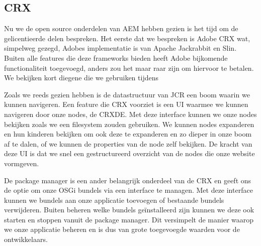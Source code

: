 \documentclass{article}
\begin{document}
	\subsection{CRX}
	Nu we de open source onderdelen van AEM hebben gezien is het tijd om de gelicentieerde delen bespreken. Het eerste dat we bespreken is Adobe CRX wat, simpelweg gezegd, Adobes implementatie is van Apache Jackrabbit en Slin. Buiten alle features die deze frameworks bieden heeft Adobe bijkomende functionaliteit toegevoegd, anders zou het maar raar zijn om hiervoor te betalen. We bekijken kort diegene die we gebruiken tijdens 
	\par
	Zoals we reeds gezien hebben is de datastructuur van JCR een boom waarin we kunnen navigeren. Een feature die CRX voorziet is een UI waarmee we kunnen navigeren door onze nodes, de CRXDE. Met deze interface kunnen we onze nodes bekijken zoals we een filesystem zouden gebruiken. We kunnen nodes expanderen en hun kinderen bekijken om ook deze te expanderen en zo dieper in onze boom af te dalen, of we kunnen de properties van de node zelf bekijken. De kracht van deze UI is dat we snel een gestructureerd overzicht van de nodes die onze website vormgeven.
	\par
	De package manager is een ander belangrijk onderdeel van de CRX en geeft ons de optie om onze OSGi bundels via een interface te managen. Met deze interface kunnen we bundels aan onze applicatie toevoegen of bestaande bundels verwijderen. Buiten beheren welke bundels geïnstalleerd zijn kunnen we deze ook starten en stoppen vanuit de package manager. Dit versimpelt de manier waarop we onze applicatie beheren en is dus van grote toegevoegde waarden voor de ontwikkelaars.
\end{document}

